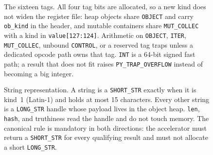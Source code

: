 \begin{figure}[p]
\caption{The sixteen tags.
All four tag bits are allocated, so a new kind does not widen the register file:
heap objects share \texttt{OBJECT} and carry \texttt{ob\_kind} in the header, and mutable containers share \texttt{MUT\_COLLEC} with a kind in \texttt{value[127:124]}.
Arithmetic on \texttt{OBJECT}, \texttt{ITER}, \texttt{MUT\_COLLEC}, unbound \texttt{CONTROL}, or a reserved tag traps unless a dedicated opcode path owns that tag.
\texttt{INT} is a 64-bit signed fast path; a result that does not fit raises \texttt{PY\_TRAP\_OVERFLOW} instead of becoming a big integer.}
\label{fig:tags}
\end{figure}

\begin{figure}[htbp]
\centering
{}
\caption{String representation.
A string is a \texttt{SHORT\_STR} exactly when it is kind~1 (Latin-1) and holds at most 15 characters.
Every other string is a \texttt{LONG\_STR} handle whose payload lives in the object heap.
\texttt{len}, \texttt{hash}, and truthiness read the handle and do not touch memory.
The canonical rule is mandatory in both directions: the accelerator must return a \texttt{SHORT\_STR} for every qualifying result and must not allocate a short \texttt{LONG\_STR}.}
\label{fig:strtag}
\end{figure}
